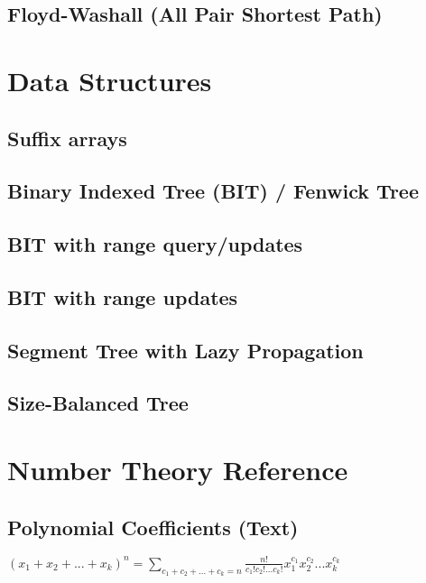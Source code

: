 \documentclass[9pt]{extarticle}
\begin{document}
\begin{multicols*}{3}
\subsection{Floyd-Washall (All Pair Shortest Path)}


\section{Data Structures}

\subsection{Suffix arrays} %


\subsection{Binary Indexed Tree (BIT) / Fenwick Tree} %


\subsection{BIT with range query/updates}


\subsection{BIT with range updates} %


\subsection{Segment Tree with Lazy Propagation} %


\subsection{Size-Balanced Tree}


\section{Number Theory Reference}
\subsection{Polynomial Coefficients (Text)} %
$(x_1 + x_2 + ... + x_k)^n = \sum_{c_1 + c_2 + ... + c_k = n}
\frac{n!}{c_1! c_2! ... c_k!} x_1^{c_1} x_2^{c_2} ... x_k^{c_k}$


\end{multicols*}
\end{document}
